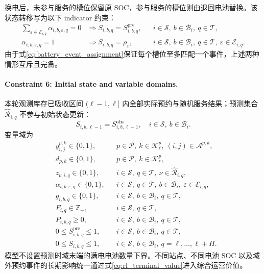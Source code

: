 \documentclass[12pt,a4paper,UTF8]{ctexart}
\begin{document}
换电后，未参与服务的槽位保留原 SOC，参与服务的槽位则由退回电池替换。该状态转移写为以下 indicator 约束：
\begin{subequations}
\label{eq:continuous_swap_transition}
\begin{align}
\sum_{\varepsilon\in\mathcal E_{i,q}}\alpha_{i,b,\varepsilon,q}=0
&\Longrightarrow
S_{i,b,q}=S_{i,b,q}^{\mathrm{pre}},
&&i\in\mathcal S,\ b\in\mathcal B_i,\ q\in\mathcal T,\\
\alpha_{i,b,\varepsilon,q}=1
&\Longrightarrow
S_{i,b,q}=\rho_\varepsilon,
&&i\in\mathcal S,\ b\in\mathcal B_i,\ q\in\mathcal T,
\ \varepsilon\in\mathcal E_{i,q}.
\end{align}
\end{subequations}
由于式\eqref{eq:battery_event_assignment}保证每个槽位至多匹配一个事件，上述两种情形互斥且完备。

\paragraph{Constraint 6: Initial state and variable domains.}
本轮观测库存已吸收区间 $(\ell-1,\ell]$ 内全部实际预约与随机服务结果；预测集合 $\widehat{\mathcal R}_{i,q}$ 不参与初始状态更新：
\begin{equation}
S_{i,b,\ell-1}
=
S_{i,b,\ell-1}^{\mathrm{obs}},
\quad i\in\mathcal S,\ b\in\mathcal B_i.
\label{eq:initial_battery_soc}
\end{equation}
变量域为
\begin{align}
&y_{i,j}^{p,k}\in\{0,1\},
&&p\in\mathcal P,\ k\in\mathcal K_\ell^p,\
(i,j)\in\mathcal A^{p,k},
\label{eq:binary_variables}\\
&d_{p,k}\in\{0,1\},
&&p\in\mathcal P,\ k\in\mathcal K_\ell^p,\\
&z_{\nu,i,q}\in\{0,1\},
&&i\in\mathcal S,\ q\in\mathcal T,\
\nu\in\widehat{\mathcal R}_{i,q},\\
&\alpha_{i,b,\varepsilon,q}\in\{0,1\},
&&i\in\mathcal S,\ q\in\mathcal T,\
b\in\mathcal B_i,\ \varepsilon\in\mathcal E_{i,q},\\
&g_{i,b,q}\in\{0,1\},
&&i\in\mathcal S,\ b\in\mathcal B_i,\ q\in\mathcal T,\\
&F_{i,q}\in\mathbb Z_+,
&&i\in\mathcal S,\ q\in\mathcal T,\\
&P_{i,b,q}\ge0,
&&i\in\mathcal S,\ b\in\mathcal B_i,\ q\in\mathcal T,\\
&0\le S_{i,b,q}^{\mathrm{pre}}\le1,
&&i\in\mathcal S,\ b\in\mathcal B_i,\ q\in\mathcal T,\\
&0\le S_{i,b,q}\le1,
&&i\in\mathcal S,\ b\in\mathcal B_i,\ q=\ell,\ldots,\ell+H.
\label{eq:continuous_soc_domains}
\end{align}
模型不设置预测时域末端的满电电池数量下界。不同站点、不同电池 SOC 以及域外预约事件的长期影响统一通过式\eqref{eq:rl_terminal_value}进入综合运营价值。
\end{document}
